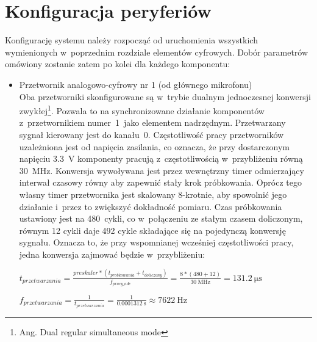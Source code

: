 \section{Konfiguracja peryferiów}
Konfigurację systemu należy rozpocząć od uruchomienia wszystkich wymienionych w~poprzednim rozdziale elementów cyfrowych. Dobór parametrów omówiony zostanie zatem po kolei dla każdego komponentu:
\begin{itemize}
	\item Przetwornik analogowo-cyfrowy nr 1 (od głównego mikrofonu)\\
	Oba przetworniki skonfigurowane są w~trybie dualnym jednoczesnej konwersji zwykłej\footnote{Ang. Dual regular simultaneous mode}. Pozwala to na synchronizowane działanie komponentów z~przetwornikiem numer~1~jako elementem nadrzędnym. Przetwarzany sygnał kierowany jest do kanału~0. Częstotliwość pracy przetworników uzależniona jest od napięcia zasilania, co oznacza, że przy dostarczonym napięciu \SI{3.3}{\V} komponenty pracują z~częstotliwością w~przybliżeniu równą \SI{30}{\MHz}. Konwersja wywoływana jest przez wewnętrzny timer odmierzający interwał czasowy równy %
	aby zapewnić stały krok próbkowania. Oprócz tego własny timer przetwornika jest skalowany 8-krotnie, aby spowolnić jego działanie i~przez to zwiększyć dokładność pomiaru. Czas próbkowania ustawiony jest na 480~cykli, co w~połączeniu ze stałym czasem doliczonym, równym 12 cykli\cite{RM0390} daje 492 cykle składające się na pojedynczą konwersję sygnału. Oznacza to, że przy wspomnianej wcześniej częstotliwości pracy, jedna konwersja zajmować będzie w~przybliżeniu:
		
\begin{center}
		$ t_{przetwarzania} = \frac{preskaler * (t_{probkowania} + t_{doliczony})}{f_{pracy\_adc}} = \frac{8*(480+12)}{\SI{30}{\MHz}} = \SI{131,2}{\micro\s} $
	
	$ f_{przetwarzania} = \frac{1}{t_{przetwarzania}} = \frac{1}{\SI{0.0001312}{\s}} \approx \SI{7622}{\Hz} $ 
	

\end{center}
\end{itemize}
